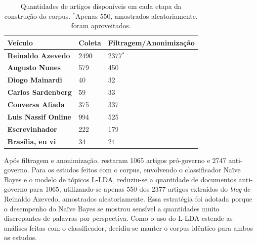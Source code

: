 
\begin{table}[t]
\centering
\begin{tabular}{| l | l | p{5cm} | }
\hline

\textbf{Veículo} & \textbf{Coleta} & \textbf{Filtragem/Anonimização} \\ \hline

\textbf{Reinaldo Azevedo} & 2490 & 2377\ensuremath{^*} \\ \hline
\textbf{Augusto Nunes} & 579 & 450 \\ \hline
\textbf{Diogo Mainardi} & 40 & 32 \\ \hline
\textbf{Carlos Sardenberg} & 59 & 33  \\ \hline
\textbf{Conversa Afiada} & 375 & 337  \\ \hline
\textbf{Luis Nassif Online} & 994 & 525 \\ \hline
\textbf{Escrevinhador} & 222 & 179  \\ \hline
\textbf{Brasília, eu vi} & 34 & 24  \\ \hline
\end{tabular}
\label{tab1:estudo}
\caption{Quantidades de artigos disponíveis em cada etapa da construção do corpus. \ensuremath{^*}Apenas 550, amostrados aleatoriamente, foram aproveitados.}
\end{table}

Após filtragem e anonimização, restaram 1065 artigos pró-governo e 2747 anti-governo. Para os estudos feitos com o corpus, envolvendo o classificador Naïve Bayes e o modelo de tópicos L-LDA, reduziu-se a quantidade de documentos anti-governo para 1065, utilizando-se apenas 550 dos 2377 artigos extraídos do \emph{blog} de Reinaldo Azevedo, amostrados aleatoriamente. Essa estratégia foi adotada porque o desempenho do  Naïve Bayes se mostrou sensível a quantidades muito discrepantes de palavras por perspectiva. Como o uso do L-LDA estende as análises feitas com o classificador, decidiu-se manter o corpus idêntico para ambos os estudos. 

